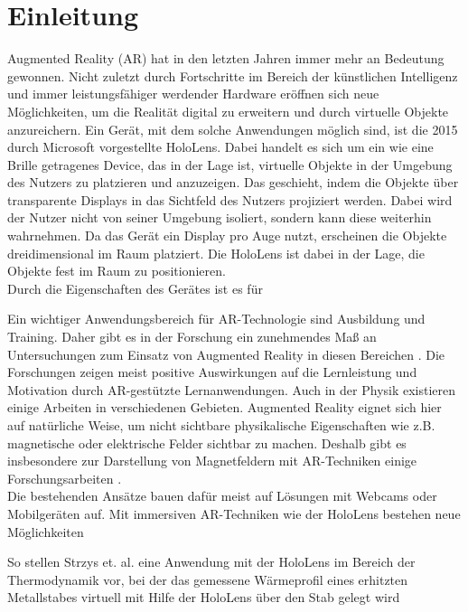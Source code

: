\section{Einleitung}
\label{sec-1}
Augmented Reality (AR) hat in den letzten Jahren immer mehr an Bedeutung gewonnen. Nicht zuletzt durch Fortschritte im Bereich der künstlichen Intelligenz und immer leistungsfähiger werdender Hardware eröffnen sich neue Möglichkeiten, um die Realität digital zu erweitern und durch virtuelle Objekte anzureichern. Ein Gerät, mit dem solche Anwendungen möglich sind, ist die 2015 durch Microsoft vorgestellte HoloLens. Dabei handelt es sich um ein wie eine Brille getragenes Device, das in der Lage ist, virtuelle Objekte in der Umgebung des Nutzers zu platzieren und anzuzeigen. Das geschieht, indem die Objekte über transparente Displays in das Sichtfeld des Nutzers projiziert werden. Dabei wird der Nutzer nicht von seiner Umgebung isoliert, sondern kann diese weiterhin wahrnehmen. Da das Gerät ein Display pro Auge nutzt, erscheinen die Objekte dreidimensional im Raum platziert. Die HoloLens ist dabei in der Lage, die Objekte fest im Raum zu positionieren.\\
\noindent\hspace*{5mm}
Durch die Eigenschaften des Gerätes ist es für
\cite{Pollalis17}

Ein wichtiger Anwendungsbereich für AR-Technologie sind Ausbildung und Training. Daher gibt es in der Forschung ein zunehmendes Maß an Untersuchungen zum Einsatz von Augmented Reality in diesen Bereichen \cite{Bacca14}. Die Forschungen zeigen meist positive Auswirkungen auf die Lernleistung und Motivation durch AR-gestützte Lernanwendungen. Auch in der Physik existieren einige Arbeiten in verschiedenen Gebieten. Augmented Reality eignet sich hier auf natürliche Weise, um nicht sichtbare physikalische Eigenschaften wie z.B. magnetische oder elektrische Felder sichtbar zu machen. Deshalb gibt es insbesondere zur Darstellung von Magnetfeldern mit AR-Techniken einige Forschungsarbeiten \cite{Buchau09, Mannuss11, Matsutomo13}.\\
\noindent\hspace*{5mm}
Die bestehenden Ansätze bauen dafür meist auf Lösungen mit Webcams oder Mobilgeräten auf. Mit immersiven AR-Techniken wie der HoloLens bestehen neue Möglichkeiten

So stellen Strzys et. al. eine Anwendung mit der HoloLens im Bereich der Thermodynamik vor, bei der das gemessene Wärmeprofil eines erhitzten Metallstabes virtuell mit Hilfe der HoloLens über den Stab gelegt wird \cite{Strzys17}

